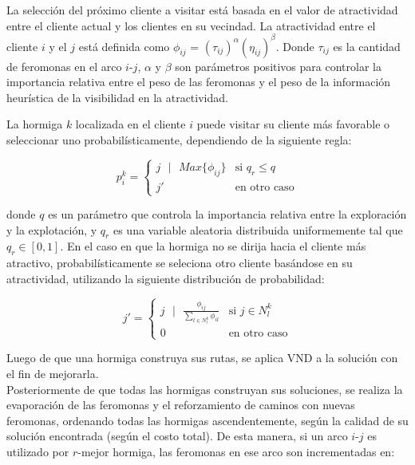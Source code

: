 La selección del próximo cliente a visitar está basada en el valor de atractividad entre el cliente actual y los clientes en su vecindad. La atractividad entre el cliente $i$ y el $j$ está definida como $\phi_{ij}$ = $(\tau_{ij})^\alpha(\eta_{ij})^\beta$. Donde $\tau_{ij}$ es la cantidad de feromonas en el arco $i$-$j$, $\alpha$ y $\beta$ son parámetros positivos para controlar la importancia relativa entre el peso de las feromonas y el peso de la información heurística de la visibilidad en la atractividad. 

La hormiga $k$ localizada en el cliente $i$ puede visitar su cliente más favorable o seleccionar uno probabilísticamente, dependiendo de la siguiente regla: 

\begin{equation}
 p_i^k =
  \begin{cases}
   j \text{ }|\text{ } Max\{\phi_{ij}\} 	& \text{si } q_r \leqslant q\\
   j' 					& \text{en otro caso}
  \end{cases}
\end{equation}

donde $q$ es un parámetro que controla la importancia relativa entre la exploración y la explotación, y $q_r$ es una variable aleatoria distribuida uniformemente tal que $q_r \in [0,1]$.
En el caso en que la hormiga no se dirija hacia el cliente más atractivo, probabilísticamente se seleciona otro cliente basándose en su atractividad, utilizando la siguiente distribución de probabilidad:

\begin{equation}
 j' =
  \begin{cases}
   j \text{ }|\text{ } \frac{\phi_{ij}}{\sum\limits_{l\in N_{l}^{k}}\phi_{il}} 	& \text{si } j\in N_{l}^{k}\\
   0 					& \text{en otro caso}
  \end{cases}
\end{equation}

Luego de que una hormiga construya sus rutas, se aplica VND a la solución con el fin de mejorarla.\\


Posteriormente de que todas las hormigas construyan sus soluciones, se realiza la evaporación de las feromonas y el reforzamiento de caminos con nuevas feromonas, ordenando todas las hormigas ascendentemente, según la calidad de su solución encontrada (según el costo total). De esta manera, si un arco $i$-$j$ es utilizado por $r$-mejor hormiga, las feromonas en ese arco son incrementadas en:

